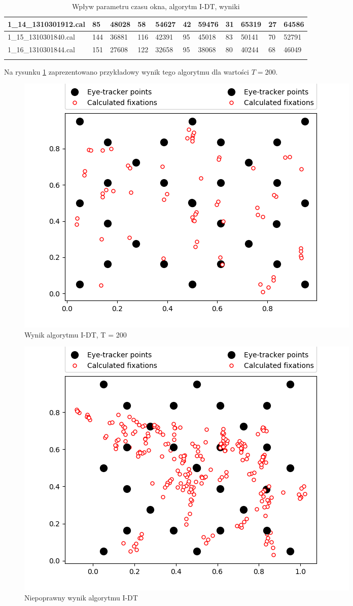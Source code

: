 {\begin{longtable}{|l|l|l|l|l|l|l|l|l|l|l|}
    1\_14\_1310301912.cal & 85 & \cellcolor[HTML]{EFEFEF}48028 & 58 & \cellcolor[HTML]{EFEFEF}54627 & 42 & \cellcolor[HTML]{EFEFEF}59476 & 31 & \cellcolor[HTML]{EFEFEF}65319 & 27 & \cellcolor[HTML]{EFEFEF}64586 \\ \hline
    1\_15\_1310301840.cal & 144 & \cellcolor[HTML]{EFEFEF}36881 & 116 & \cellcolor[HTML]{EFEFEF}42391 & 95 & \cellcolor[HTML]{EFEFEF}45018 & 83 & \cellcolor[HTML]{EFEFEF}50141 & 70 & \cellcolor[HTML]{EFEFEF}52791 \\ \hline
    1\_16\_1310301844.cal & 151 & \cellcolor[HTML]{EFEFEF}27608 & 122 & \cellcolor[HTML]{EFEFEF}32658 & 95 & \cellcolor[HTML]{EFEFEF}38068 & 80 & \cellcolor[HTML]{EFEFEF}40244 & 68 & \cellcolor[HTML]{EFEFEF}46049 \\ \hline
    \caption{Wpływ parametru czasu okna, algorytm I-DT, wyniki}
    \label{tab:idttimefixcomparison}\\
\end{longtable}
}\par
Na rysunku \ref{fig:idtt200} zaprezentowano przykładowy wynik tego algorytmu dla wartości $T = 200$.
\begin{figure}[H]
    \centering
    \captionsetup{justification=centering,margin=2cm}
    \includegraphics[width=0.8\linewidth]{resources/idt/idt-time-200-04.png}
    \caption{Wynik algorytmu I-DT, T = 200}
    \label{fig:idtt200}
\end{figure}
\begin{figure}[H]
    \centering
    \captionsetup{justification=centering,margin=2cm}
    \includegraphics[width=0.8\linewidth]{resources/idt/idt-time-100-1_01-incorrect.png}
    \caption{Niepoprawny wynik algorytmu I-DT}
    \label{fig:idtweird}
\end{figure}

